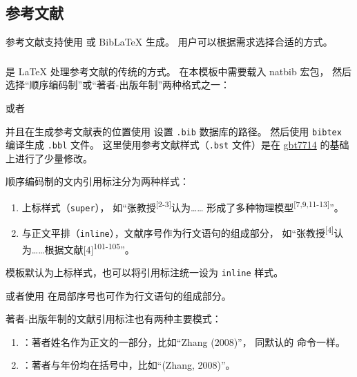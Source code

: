 \documentclass[a4paper]{ltxdoc}
\DeclareRobustCommand\file{\nolinkurl}
\DeclareRobustCommand\pkg{\textsf}
\DeclareRobustCommand\opt{\texttt}
\begin{document}
\subsection{参考文献}

参考文献支持使用 \BibTeX{} 或 BibLaTeX 生成。
用户可以根据需求选择合适的方式。


\subsubsection{\BibTeX}

\BibTeX{} 是 \LaTeX{} 处理参考文献的传统的方式。
在本模板中需要载入 \pkg{natbib} 宏包，
然后选择“顺序编码制”或“著者-出版年制”两种格式之一：
\begin{latex}
  \usepackage[sort]{natbib}
  
\end{latex}
或者
\begin{latex}
  \usepackage{natbib}
  
\end{latex}
并且在生成参考文献表的位置使用  设置 \file{.bib} 数据库的路径。
然后使用 \file{bibtex} 编译生成 \file{.bbl} 文件。
这里使用参考文献样式（\file{.bst} 文件）是在
\href{https://ctan.org/pkg/gbt7714}{\pkg{gbt7714}}
的基础上进行了少量修改。

顺序编码制的文内引用标注分为两种样式：
\begin{enumerate}
  \item 上标样式（\opt{super}）， 如“张教授\textsuperscript{[2-3]}认为……
    形成了多种物理模型\textsuperscript{[7,9,11-13]}”。
  \item 与正文平排（\opt{inline}），文献序号作为行文语句的组成部分，
    如“张教授\textsuperscript{[4]}认为……根据文献[4]\textsuperscript{101-105}”。
\end{enumerate}

模板默认为上标样式，也可以将引用标注统一设为 \opt{inline} 样式。
\begin{latex}
\end{latex}
或者使用  在局部序号也可作为行文语句的组成部分。

著者-出版年制的文献引用标注也有两种主要模式：
\begin{enumerate}
  \item {}：著者姓名作为正文的一部分，比如“Zhang (2008)”，
    同默认的  命令一样。
  \item {}：著者与年份均在括号中，比如“(Zhang, 2008)”。
\end{enumerate}
\end{document}
